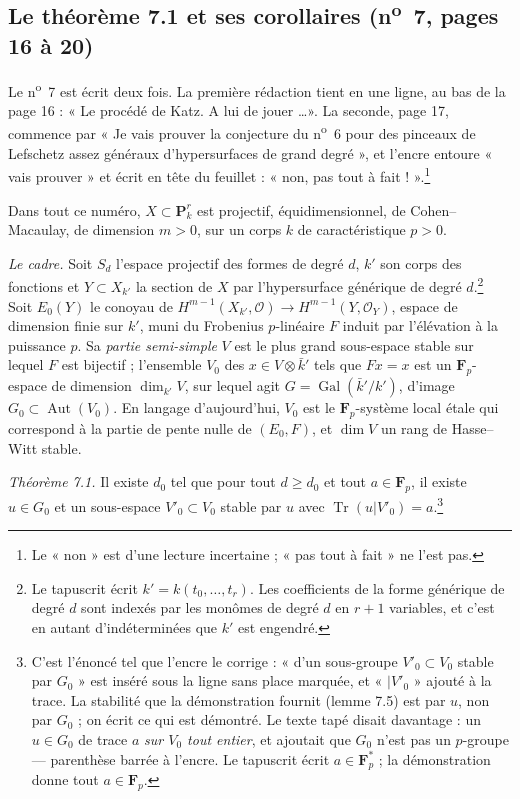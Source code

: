 \documentclass[11pt,a4paper]{article}
\begin{document}
\subsection*{Le théorème 7.1 et ses corollaires (n\textsuperscript{o}~7, pages 16 à 20)}

Le n\textsuperscript{o}~7 est écrit deux fois. La première rédaction tient en une
ligne, au bas de la page 16 : « Le procédé de Katz. A lui de jouer \ldots ». La
seconde, page 17, commence par « Je vais prouver la conjecture du
n\textsuperscript{o}~6 pour des pinceaux de Lefschetz assez généraux
d'hypersurfaces de grand degré », et l'encre entoure « vais prouver » et écrit
en tête du feuillet : « non, pas tout à fait ! ».\footnote{Le « non » est d'une
lecture incertaine ; « pas tout à fait » ne l'est pas.}

Dans tout ce numéro, $X \subset \mathbf{P}^r_k$ est projectif, équidimensionnel,
de Cohen--Macaulay, de dimension $m > 0$, sur un corps $k$ de caractéristique
$p > 0$.

\emph{Le cadre.} Soit $S_d$ l'espace projectif des formes de degré $d$, $k'$ son
corps des fonctions et $Y \subset X_{k'}$ la section de $X$ par l'hypersurface
générique de degré $d$.\footnote{Le tapuscrit écrit $k' = k(t_0, \ldots, t_r)$.
Les coefficients de la forme générique de degré $d$ sont indexés par les monômes
de degré $d$ en $r+1$ variables, et c'est en autant d'indéterminées que $k'$ est
engendré.} Soit $E_0(Y)$ le conoyau de $H^{m-1}(X_{k'}, \mathcal{O}) \to
H^{m-1}(Y, \mathcal{O}_Y)$, espace de dimension finie sur $k'$, muni du Frobenius
$p$-linéaire $F$ induit par l'élévation à la puissance $p$. Sa \emph{partie
semi-simple} $V$ est le plus grand sous-espace stable sur lequel $F$ est bijectif ;
l'ensemble $V_0$ des $x \in V \otimes \bar k'$ tels que $Fx = x$ est un
$\mathbf{F}_p$-espace de dimension $\dim_{k'}V$, sur lequel agit
$G = \operatorname{Gal}(\bar k'/k')$, d'image $G_0 \subset
\operatorname{Aut}(V_0)$. En langage d'aujourd'hui, $V_0$ est le
$\mathbf{F}_p$-système local étale qui correspond à la partie de pente nulle de
$(E_0, F)$, et $\dim V$ un rang de Hasse--Witt stable.

\emph{Théorème 7.1.} Il existe $d_0$ tel que pour tout $d \geqslant d_0$ et tout
$a \in \mathbf{F}_p$, il existe $u \in G_0$ et un sous-espace $V'_0 \subset V_0$
stable par $u$ avec $\operatorname{Tr}(u|V'_0) = a$.\footnote{C'est l'énoncé tel
que l'encre le corrige : « d'un sous-groupe $V'_0 \subset V_0$ stable par $G_0$ »
est inséré sous la ligne sans place marquée, et « $|V'_0$ » ajouté à la trace. La
stabilité que la démonstration fournit (lemme 7.5) est par $u$, non par $G_0$ ;
on écrit ce qui est démontré. Le texte tapé disait davantage : un $u \in G_0$ de
trace $a$ \emph{sur $V_0$ tout entier}, et ajoutait que $G_0$ n'est pas un
$p$-groupe --- parenthèse barrée à l'encre. Le tapuscrit écrit
$a \in \mathbf{F}_p^*$ ; la démonstration donne tout $a \in \mathbf{F}_p$.}
\end{document}
